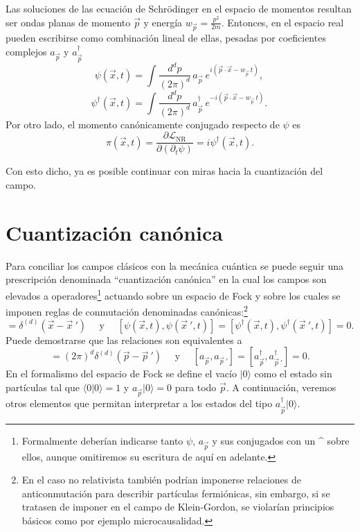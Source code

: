 Las soluciones de las ecuación de Schr\"{o}dinger en el espacio de momentos resultan ser ondas planas de momento $\vec{p}$ y energía $w_{\vec{p}}=\frac{p^2}{2m}$. Entonces, en el espacio real pueden escribirse como combinación lineal de ellas, pesadas por coeficientes complejos $a_{\vec{p}}$ y $a_{\vec{p}}^{\dag}$
\begin{equation}
\psi (\vec{x},t)=\int \frac{d^dp}{(2\pi)^d}\, a_{\vec{p}}\:e^{i(\vec{p}\cdot\vec{x}-w_{\vec{p}}\:t)},\,
\end{equation}
\begin{equation}
\psi ^{\dag}(\vec{x},t)=\int \frac{d^dp}{(2\pi)^d}\, a_{\vec{p}}^{\dag}\:e^{-i(\vec{p}\cdot\vec{x}-w_{\vec{p}}\:t)}.\,
\end{equation}
Por otro lado, el momento canónicamente conjugado respecto de $\psi$ es
\begin{equation}
\pi(\vec{x},t)=\frac{\partial \mathcal{L}_{\text{NR}}}{\partial(\partial_t \psi)}=i\psi^{\dag}(\vec{x},t).
\end{equation}

Con esto dicho, ya es posible continuar con miras hacia la cuantización del campo.
\section{Cuantización canónica}
Para conciliar los campos clásicos con la mecánica cuántica se puede seguir una prescripción denominada “cuantización canónica” en la cual los campos son elevados a operadores\footnote{Formalmente deberían indicarse tanto $\psi$, $a_{\vec{p}}$ y sus conjugados con un \^{} sobre ellos, aunque omitiremos su escritura de aquí en adelante.} actuando sobre un espacio de Fock y sobre los cuales se imponen reglas de conmutación denominadas canónicas:\footnote{En el caso no relativista también podrían imponerse relaciones de anticonmutación para describir partículas fermiónicas, sin embargo, si se tratasen de imponer en el campo de Klein-Gordon, se violarían principios básicos como por ejemplo microcausalidad.}
\begin{equation}
[\psi(\vec{x},t),\psi^{\dag}(\vec{x}\:',t)]=\delta^{(d)}(\vec{x}-\vec{x}\:')\:\:\:\:\:\: \text{y}\:\:\:\:\:\:[\psi(\vec{x},t),\psi(\vec{x}\:',t)]=[\psi^{\dag}(\vec{x},t),\psi^{\dag}(\vec{x}\:',t)]=0.
\label{eq:conmut_psi_psid}
\end{equation}
Puede demostrarse que las relaciones son equivalentes a
\begin{equation}
[a_{\vec{p}},a_{\vec{p}\:'}^{\dag}]=(2\pi)^d\delta^{(d)}(\vec{p}-\vec{p}\:')\:\:\:\:\:\:\text{y}\:\:\:\:\:\:[a_{\vec{p}},a_{\vec{p}\:'}]=[a_{\vec{p}}^{\dag},a_{\vec{p}\:'}^{\dag}]=0.
\end{equation}
En el formalismo del espacio de Fock se define el vacío $|0\rangle$ como el estado sin partículas tal que $\langle 0|0\rangle=1$ y $a_{\vec{p}}|0\rangle=0$ para todo $\vec{p}$. A continuación, veremos otros elementos que permitan interpretar a los estados del tipo $a_{\vec{p}}^{\dag}|0\rangle$.

